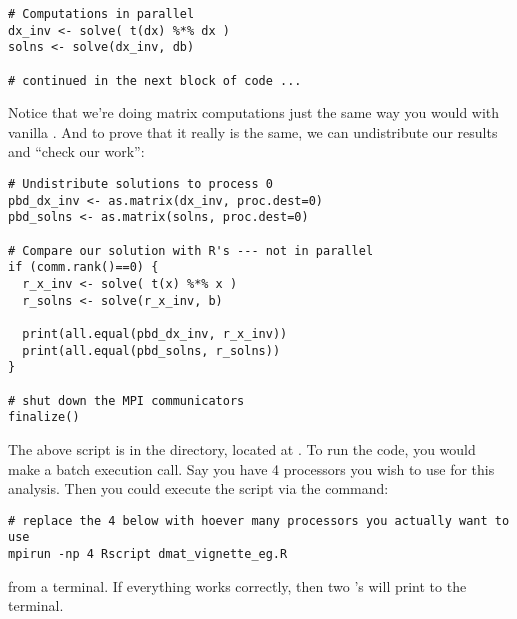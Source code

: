 \begin{lstlisting}[language=rr,title=Simple Matrix Operations]
# Computations in parallel
dx_inv <- solve( t(dx) %*% dx )
solns <- solve(dx_inv, db)

# continued in the next block of code ...
\end{lstlisting}

Notice that we're doing matrix computations just the same way you would with vanilla .  And to prove that it really is the same, we can undistribute our results and ``check our work'':

\begin{lstlisting}[language=rr,title=Comparing Results to \proglang{R}]
# Undistribute solutions to process 0
pbd_dx_inv <- as.matrix(dx_inv, proc.dest=0)
pbd_solns <- as.matrix(solns, proc.dest=0)

# Compare our solution with R's --- not in parallel
if (comm.rank()==0) {
  r_x_inv <- solve( t(x) %*% x )
  r_solns <- solve(r_x_inv, b)
  
  print(all.equal(pbd_dx_inv, r_x_inv))
  print(all.equal(pbd_solns, r_solns))
}

# shut down the MPI communicators
finalize()
\end{lstlisting}

The above script is in the  directory, located at .  To run the code, you would make a batch execution call.  Say you have 4 processors you wish to use for this analysis.  Then you could execute the script via the command:

\begin{lstlisting}
# replace the 4 below with hoever many processors you actually want to use
mpirun -np 4 Rscript dmat_vignette_eg.R
\end{lstlisting}

from a terminal.  If everything works correctly, then two 's will print to the terminal.